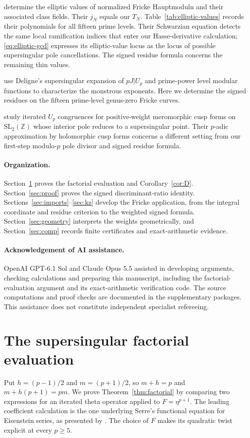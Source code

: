 \documentclass[11pt,a4paper]{article}
\numberwithin{equation}{section}
\theoremstyle{definition}
\theoremstyle{remark}
\newcommand{\Z}{\mathbb Z}
\begin{document}
\citet[\S4.2, Table~1 and Appendix~C]{JST19} determine the elliptic values
of normalized Fricke Hauptmoduln and their associated class fields. Their
$j_N$ equals our $T_N$. Table~\ref{tab:elliptic-values} records their
polynomials for all fifteen prime levels. Their Schwarzian equation
detects the same local ramification indices that enter our Hasse-derivative
calculation; \eqref{eq:elliptic-gcd} expresses its elliptic-value locus as
the locus of possible supersingular pole cancellations. The signed residue
formula concerns the remaining thin values.

\citet[Proposition~3.1 and \S4]{DS26} use Deligne's supersingular
expansion of $pJ|U_p$ and prime-power level modular functions to
characterize the monstrous exponents. Here we determine the signed
residues on the fifteen prime-level genus-zero Fricke curves.

\citet[Theorem~1.1]{BGKMR26} study iterated $U_p$ congruences for
positive-weight meromorphic cusp forms on $\mathrm{SL}_2(\Z)$ whose
interior pole reduces to a supersingular point. Their $p$-adic
approximation by holomorphic cusp forms concerns a different setting
from our first-step modulo-$p$ pole divisor and signed residue formula.

\paragraph{Organization.}
Section~\ref{sec:factorial} proves the factorial evaluation and
Corollary~\ref{cor:D}. Section~\ref{sec:proof} proves the signed
discriminant-ratio identity. Sections~\ref{sec:imports}--\ref{sec:kz}
develop the Fricke application, from the integral coordinate and residue
criterion to the weighted signed formula. Section~\ref{sec:geometry}
interprets the weights geometrically, and Section~\ref{sec:comp}
records finite certificates and exact-arithmetic evidence.

\paragraph{Acknowledgement of AI assistance.}
OpenAI GPT-6.1 Sol and Claude Opus 5.5 assisted in developing arguments, checking 
calculations and preparing this manuscript, including the factorial-evaluation 
argument and its exact-arithmetic verification code. The source computations
and proof checks are documented in the supplementary packages.
This assistance does not constitute independent specialist refereeing.

\section{The supersingular factorial evaluation}\label{sec:factorial}
Put $h=(p-1)/2$ and $m=(p+1)/2$, so $m+h=p$ and
$m+h(p+1)=pm$. We prove Theorem~\ref{thm:factorial} by comparing two
expressions for an iterated theta operator applied to $F=\eta^{p+1}$.
The leading coefficient calculation is the one underlying Serre's
functional equation for Eisenstein series, as presented by
\citet[\S2.5, Th\'eor\`eme~2, p.~119]{Robert80}. The choice of $F$ makes
its quadratic twist explicit at every $p\ge5$.
\end{document}
